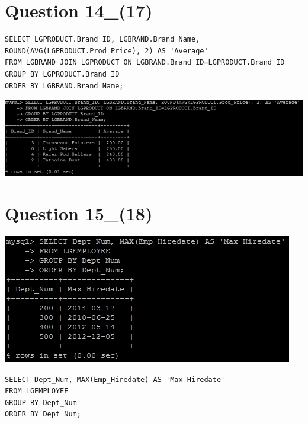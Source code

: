 \documentclass[a4paper,10pt]{article}
\begin{document}
\section*{Question 14_(17)}
\lstset{
            language=SQL,
            breaklines=true
            }
        \begin{lstlisting}[frame=single]
        SELECT LGPRODUCT.Brand_ID, LGBRAND.Brand_Name, ROUND(AVG(LGPRODUCT.Prod_Price), 2) AS 'Average'
FROM LGBRAND JOIN LGPRODUCT ON LGBRAND.Brand_ID=LGPRODUCT.Brand_ID
GROUP BY LGPRODUCT.Brand_ID
ORDER BY LGBRAND.Brand_Name;

        \end{lstlisting}
\includegraphics{Queries/Question_14_(17)/Q14_screenshot.jpg}
\section*{Question 15_(18)}
\includegraphics{Queries/Question_15_(18)/Q15_screenshot.jpg}
\lstset{
            language=SQL,
            breaklines=true
            }
        \begin{lstlisting}[frame=single]
        SELECT Dept_Num, MAX(Emp_Hiredate) AS 'Max Hiredate'
FROM LGEMPLOYEE
GROUP BY Dept_Num
ORDER BY Dept_Num;

        \end{lstlisting}
\end{document}
